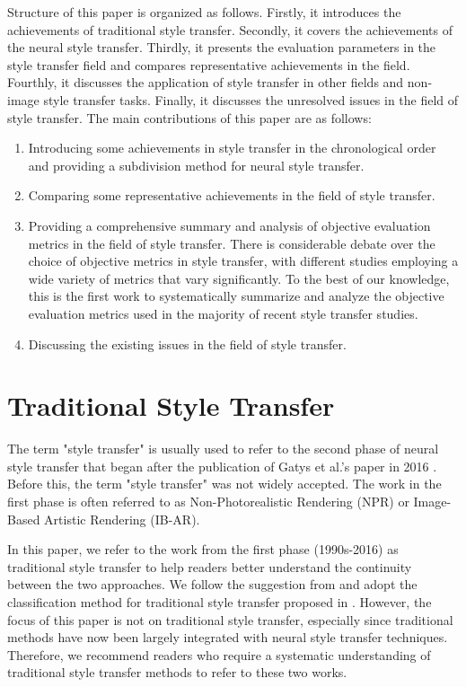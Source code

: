 \documentclass[preprint,12pt]{elsarticle}
\begin{document}
Structure of this paper is organized as follows. Firstly, it introduces the achievements of traditional style transfer. Secondly, it covers the achievements of the neural style transfer. Thirdly, it presents the evaluation parameters in the style transfer field and compares representative achievements in the field. Fourthly, it discusses the application of style transfer in other fields and non-image style transfer tasks. Finally, it discusses the unresolved issues in the field of style transfer. The main contributions of this paper are as follows:
\begin{enumerate}
    \item Introducing some achievements in style transfer in the chronological order and providing a subdivision method for neural style transfer.
    \item Comparing some representative achievements in the field of style transfer.
    \item Providing a comprehensive summary and analysis of objective evaluation metrics in the field of style transfer. There is considerable debate over the choice of objective metrics in style transfer, with different studies employing a wide variety of metrics that vary significantly. To the best of our knowledge, this is the first work to systematically summarize and analyze the objective evaluation metrics used in the majority of recent style transfer studies.
    \item Discussing the existing issues in the field of style transfer.
\end{enumerate}

% 
\section{Traditional Style Transfer}

The term "style transfer" is usually used to refer to the second phase of neural style transfer that began after the publication of Gatys et al.'s paper in 2016 \citep{02gatys2016image}. Before this, the term "style transfer" was not widely accepted. The work in the first phase is often referred to as Non-Photorealistic Rendering (NPR) or Image-Based Artistic Rendering (IB-AR).

In this paper, we refer to the work from the first phase (1990s-2016) as traditional style transfer to help readers better understand the continuity between the two approaches. We follow the suggestion from \citep{01jing2019neural} and adopt the classification method for traditional style transfer proposed in \citep{21kyprianidis2012state}. However, the focus of this paper is not on traditional style transfer, especially since traditional methods have now been largely integrated with neural style transfer techniques. Therefore, we recommend readers who require a systematic understanding of traditional style transfer methods to refer to these two works\citep{01jing2019neural,21kyprianidis2012state}.
\end{document}
